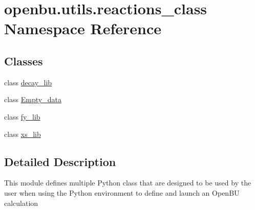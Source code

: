 \hypertarget{namespaceopenbu_1_1utils_1_1reactions__class}{}\section{openbu.\+utils.\+reactions\+\_\+class Namespace Reference}
\label{namespaceopenbu_1_1utils_1_1reactions__class}
\subsection*{Classes}
\begin{DoxyCompactItemize}
\item 
class \mbox{\hyperlink{classopenbu_1_1utils_1_1reactions__class_1_1decay__lib}{decay\+\_\+lib}}
\item 
class \mbox{\hyperlink{classopenbu_1_1utils_1_1reactions__class_1_1_empty__data}{Empty\+\_\+data}}
\item 
class \mbox{\hyperlink{classopenbu_1_1utils_1_1reactions__class_1_1fy__lib}{fy\+\_\+lib}}
\item 
class \mbox{\hyperlink{classopenbu_1_1utils_1_1reactions__class_1_1xs__lib}{xs\+\_\+lib}}
\end{DoxyCompactItemize}


\subsection{Detailed Description}
\begin{DoxyVerb}This module defines multiple Python class that are designed to be used by the user when using
the Python environment to define and launch an OpenBU calculation\end{DoxyVerb}
 
